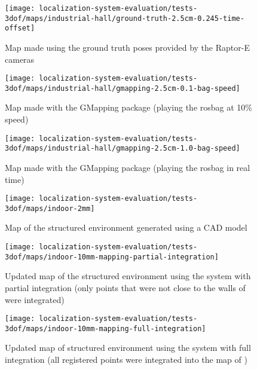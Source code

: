 \begin{figure}[H]
	\centering
	\texttt{[image: localization-system-evaluation/tests-3dof/maps/industrial-hall/ground-truth-2.5cm-0.245-time-offset]}
	\caption{Map made using the ground truth poses provided by the Raptor-E cameras}
	\label{fig:localization-system-evaluation_ground-truth-2.5cm-0.245-time-offset}
\end{figure}


\begin{figure}[H]
	\centering
	\texttt{[image: localization-system-evaluation/tests-3dof/maps/industrial-hall/gmapping-2.5cm-0.1-bag-speed]}
	\caption{Map made with the GMapping package (playing the rosbag at 10\% speed)}
	\label{fig:localization-system-evaluation_gmapping-2.5cm-0.1-bag-speed}
\end{figure}

\begin{figure}[H]
	\centering
	\texttt{[image: localization-system-evaluation/tests-3dof/maps/industrial-hall/gmapping-2.5cm-1.0-bag-speed]}
	\caption{Map made with the GMapping package (playing the rosbag in real time)}
	\label{fig:localization-system-evaluation_gmapping-2.5cm-1.0-bag-speed}
\end{figure}


\begin{figure}[H]
	\centering
	\texttt{[image: localization-system-evaluation/tests-3dof/maps/indoor-2mm]}
	\caption{Map of the structured environment generated using a CAD model}
	\label{fig:localization-system-evaluation_indoor-2mm}
\end{figure}

\begin{figure}[H]
	\centering
	\texttt{[image: localization-system-evaluation/tests-3dof/maps/indoor-10mm-mapping-partial-integration]}
	\caption{Updated map of the structured environment using the  system with partial integration (only points that were not close to the walls of  were integrated)}
	\label{fig:localization-system-evaluation_indoor-10mm-mapping-partial-integration}
\end{figure}

\begin{figure}[H]
	\centering
	\texttt{[image: localization-system-evaluation/tests-3dof/maps/indoor-10mm-mapping-full-integration]}
	\caption{Updated map of structured environment using the  system with full integration (all registered points were integrated into the map of )}
	\label{fig:localization-system-evaluation_indoor-10mm-mapping-full-integration}
\end{figure}


